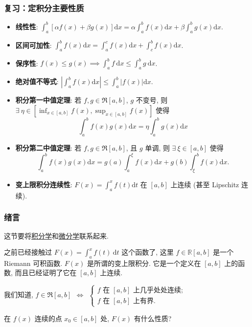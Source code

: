 \begin{frame}
\frametitle{复习：定积分主要性质}
\begin{itemize}
\item \textbf{线性性}: $\int_a^b [\alpha f(x) + \beta g(x)] \mathrm{d}x = \alpha \int_a^b f(x) \mathrm{d}x + \beta \int_a^b g(x) \mathrm{d}x$.
\item \textbf{区间可加性}: $\int_a^b f(x) \mathrm{d}x = \int_a^c f(x) \mathrm{d}x + \int_c^b f(x) \mathrm{d}x$.
\item \textbf{保序性}: $f(x) \le g(x) \implies \int_a^b f ~ \mathrm{d}x \leqslant \int_a^b g ~ \mathrm{d}x$.
\item \textbf{绝对值不等式}: $\left|\int_a^b f(x) \mathrm{d}x\right| \le \int_a^b |f(x)| \mathrm{d}x$.
\item \textbf{积分第一中值定理}: 若 $f, g \in \mathfrak{R}[a, b]$, $g$ 不变号, 则 $\exists ~ \eta \in \left[ \inf_{x \in [a, b]} f(x), \sup_{x \in [a, b]} f(x) \right]$ 使得
\[ \int_a^b f(x) g(x) \mathrm{d}x = \eta \int_a^b g(x) \mathrm{d}x \]
\item \textbf{积分第二中值定理}: 若 $f, g \in \mathfrak{R}[a, b]$, 且 $g$ 单调, 则 $\exists ~ \xi \in [a, b]$ 使得
\[ \int_a^b f(x) g(x) \mathrm{d}x = g(a) \int_a^{\xi} f(x) \mathrm{d}x + g(b) \int_{\xi}^b f(x) \mathrm{d}x. \]
\item \textbf{变上限积分连续性}: $F(x) = \int_a^x f(t) \mathrm{d}t$ 在 $[a,b]$ 上连续 (甚至 Lipschitz 连续).
\end{itemize}
\end{frame}


\begin{frame}
\frametitle{绪言}

{
\larger[2]

\begin{center}
这节要将\underline{积分学}和\underline{微分学}联系起来.
\end{center}

\pause
\vspace{1em}

之前已经接触过 $F(x) = \int_a^x f(t) ~ \mathrm{d} t$ 这个函数了, 这里 $f \in \mathbb{R}[a, b]$ 是一个 Riemann 可积函数. $F(x)$ 是所谓的\alert{变上限积分}. 它是一个定义在 $[a, b]$ 上的函数, 而且已经证明了它在 $[a, b]$ 上连续.

\pause
\vspace{1em}

我们知道, $f \in \mathfrak{R}[a, b] ~~ \iff ~~ \begin{cases} f \text{ 在 } [a, b] \text{ 上几乎处处连续}; \\ f \text{ 在 } [a, b] \text{ 上有界}. \end{cases}$

\begin{question}
在 $f(x)$ 连续的点 $x_0 \in [a, b]$ 处, $F(x)$ 有什么性质?
\end{question}
}

\end{frame}

